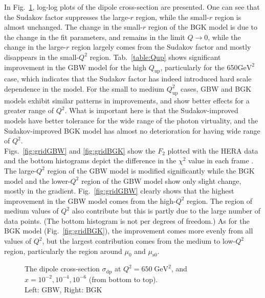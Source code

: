 \documentclass[11pt]{article}
\begin{document}
In Fig.~\ref{dipole}, log-log plots of the dipole cross-section are presented. One can see that the Sudakov factor suppresses the large-$r$ region, while the small-$r$ region is almost unchanged. The change in the small-$r$ region of the BGK model is due to the change in the fit parameters, and remains in the limit $Q\rightarrow0$, while the change in the large-$r$ region largely comes from the Sudakov factor and mostly disappears in the small-$Q^2$ region. 
Tab.~\ref{table:Qup} shows significant improvement in the GBW model for the high $Q_{\mathrm{up}}$, particularly for the 650$\mathrm{GeV^2}$ case, which indicates that the Sudakov factor has indeed introduced hard scale dependence in the model. For the small to medium $Q^2_{\mathrm{up}}$ cases, GBW and BGK models exhibit similar patterns in improvements, and show better effects for a greater range of $Q^2$.
What is important here is that the Sudakov-improved models have better tolerance for the wide range of the photon virtuality, and the Sudakov-improved BGK model has almost no deterioration for having wide range of $Q^2$.\\
Figs.~\ref{fig:gridGBW} and \ref{fig:gridBGK} show the $F_2$ plotted with the HERA data and the bottom histograms depict the difference in the $\chi^2$ value in each frame . 
The large-$Q^2$ region of the GBW model is modified significantly while the BGK model and the lower-$Q^2$ region of the GBW model show only slight change, mostly in the gradient. 
Fig.~\ref{fig:gridGBW} clearly shows that the highest improvement in the GBW model comes from the high-$Q^2$ region. The region of medium values of $Q^2$ also contribute but this is partly due to the large number of data points. (The bottom histogram is not per degrees of freedom.) As for the BGK model (Fig.~\ref{fig:gridBGK}), the improvement comes more evenly from all values of  $Q^2$, but the largest contribution comes from the medium to low-$Q^2$ region, particularly the region around $\mu_0$ and $\mu_{\mathrm{s0}}$.

\begin{figure}[H]
\caption{The dipole cross-section $\sigma_{\mathrm{dp}}$ at $Q^2=650\;\mathrm{GeV^2}$, and $x=10^{-2},10^{-4}, 10^{-6}$ (from bottom to top).\\Left: GBW, Right: BGK}
\label{dipole}
\end{figure}
\end{document}
